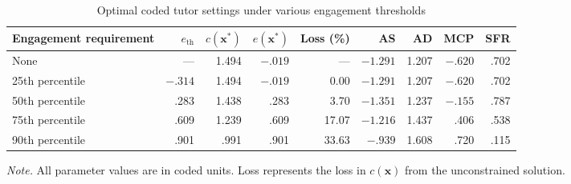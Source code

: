 \documentclass[12pt]{article}
\begin{document}
\begin{table}[htbp]
    \centering
    \caption{Optimal coded tutor settings under various engagement thresholds}
    \label{tab:constrained-optima}
    \begin{threeparttable}
        \begin{tabular}{lrrrrrrrr}
            \toprule
            Engagement requirement
            & $e_{\mathrm{th}}$
            & $c(\mathbf{x}^{*})$
            & $e(\mathbf{x}^{*})$
            & Loss (\%)
            & AS
            & AD
            & MCP
            & SFR \\
            \midrule
            None
                & ---     & 1.494 & $-.019$ & ---   & $-1.291$ & 1.207 & $-.620$ & .702 \\
            25th percentile
                & $-.314$ & 1.494 & $-.019$ & 0.00  & $-1.291$ & 1.207 & $-.620$ & .702 \\
            50th percentile
                & .283    & 1.438 & .283    & 3.70  & $-1.351$ & 1.237 & $-.155$ & .787 \\
            75th percentile
                & .609    & 1.239 & .609    & 17.07 & $-1.216$ & 1.437 & .406    & .538 \\
            90th percentile
                & .901    & .991  & .901    & 33.63 & $-.939$  & 1.608 & .720    & .115 \\
            \bottomrule
        \end{tabular}
        \begin{tablenotes}[flushleft]
            \footnotesize
            \item \textit{Note.} All parameter values are in coded units. Loss represents the loss in $c(\textbf{x})$ from the unconstrained solution.
        \end{tablenotes}
    \end{threeparttable}
\end{table}
\end{document}
